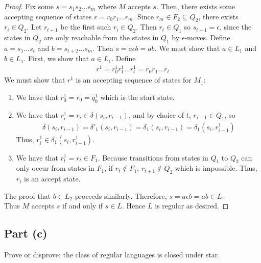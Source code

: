 \documentclass{article}
\begin{document}
\begin{proof}
    \noindent
    Fix some $s = s_1 s_2 \ldots s_m$ where $M$ accepts $s$. Then, there exists some accepting sequence of states $r = r_0 r_1 \ldots r_m$. Since 
    $r_m \in F_2 \subseteq Q_2$, there exists $r_i \in Q_2$. Let $r_{t+1}$ be the first such $r_i \in Q_2$. Then $r_t \in Q_1$ so $s_{t+1} = \epsilon$, since 
    the states in $Q_2$ are only reachable from the states in $Q_1$ by $\epsilon$-moves. Define $a = s_1 \ldots s_{t}$ and $b = s_{t+2} \ldots s_{m}$. Then
    $s = a \epsilon b = a b$. We must show that $a \in L_1$ and $b \in L_1$. First, we show that $a \in L_1$. Define 
    \begin{align*}
        r^1 = r_0^1 r_1^1 \ldots r_{t}^1 = r_0 r_1 \ldots r_{t}
    \end{align*}
    We must show that $r^1$ is an accepting sequence of states for $M_1$:
    \begin{enumerate}
        \item We have that $r^1_0 = r_0 = q_0^1$ which is the start state.
        \item We have that $r^1_i = r_i \in \delta(s_i, r_{i-1})$, and by choice of $t$, $r_{i-1} \in Q_1$, so 
        \begin{align*}
            \delta(s_i, r_{i-1}) = \delta'_1(s_i, r_{i-1}) = \delta_1(s_i, r_{i-1}) = \delta_1(s_i, r_{i-1}^1)
        \end{align*}
        Thus, $r^1_i \in \delta_1(s_i, r_{i-1}^1)$.
        \item We have that $r_{t}^1 = r_{t} \in F_1$. Because transitions from states in $Q_1$ to $Q_2$ can only occur from 
        states in $F_1$, if $r_t \not \in F_1$, $r_{t+1} \not \in Q_2$ which is impossible. Thus, $r_t$ is an accept state.  
    \end{enumerate}
    The proof that $b \in L_2$ proceeds similarly. Therefore, $s = a\epsilon b = ab \in L$. \\

    \noindent
    Thus $M$ accepts $s$ if and only if $s \in L$. Hence $L$ is regular as desired.
\end{proof}

\subsection*{Part (c)}

Prove or disprove: the class of regular languages is closed under star.
\end{document}
